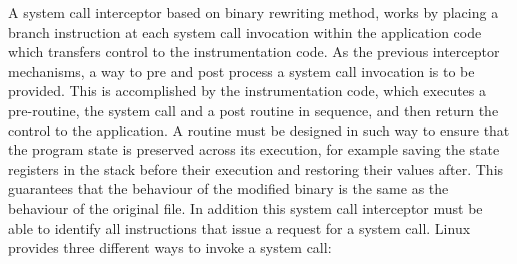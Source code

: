 A system call interceptor based on binary rewriting method, works by placing a branch instruction at each system call invocation within the application code which transfers control to the instrumentation code. As the previous interceptor mechanisms, a way to pre and post process a system call invocation is to be provided. This is accomplished by the instrumentation code, which executes a pre-routine, the system call and a post routine in sequence, and then return the control to the application. A routine must be designed in such way to ensure that the program state is preserved across its execution, for example saving the state registers in the stack before their execution and restoring their values after. This guarantees that the behaviour of the modified binary is the same as the behaviour of the original file.  In addition this system call interceptor must be able to identify all instructions that issue a request for a system call. Linux provides three different ways to invoke a system call:

